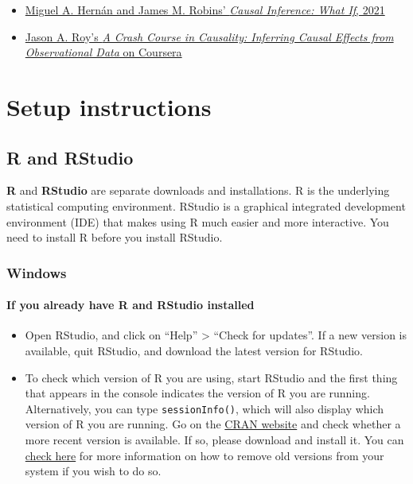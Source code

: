 \documentclass[12pt, krantz2,]{book}
\providecommand{\tightlist}{%
  \setlength{\itemsep}{0pt}\setlength{\parskip}{0pt}}
\let\oldparagraph\paragraph
\renewcommand{\paragraph}[1]{\oldparagraph{#1}\mbox{}}
\theoremstyle{definition}
\theoremstyle{definition}
\theoremstyle{definition}
\newcommand{\1}{\mathbbm{1}}
\begin{document}
\begin{itemize}
\tightlist
\item
  \href{https://www.hsph.harvard.edu/miguel-hernan/causal-inference-book/}{Miguel A. Hernán and James M. Robins' \emph{Causal Inference: What If},
  2021}
\item
  \href{https://www.coursera.org/learn/crash-course-in-causality}{Jason A. Roy's \emph{A Crash Course in Causality: Inferring Causal Effects from
  Observational Data} on
  Coursera}
\end{itemize}

\hypertarget{setup}{%
\section{Setup instructions}\label{setup}}

\hypertarget{r-and-rstudio}{%
\subsection{R and RStudio}\label{r-and-rstudio}}

\textbf{R} and \textbf{RStudio} are separate downloads and installations. R is the
underlying statistical computing environment. RStudio is a graphical integrated
development environment (IDE) that makes using R much easier and more
interactive. You need to install R before you install RStudio.

\hypertarget{windows}{%
\subsubsection{Windows}\label{windows}}

\hypertarget{if-you-already-have-r-and-rstudio-installed}{%
\paragraph{If you already have R and RStudio installed}\label{if-you-already-have-r-and-rstudio-installed}}

\begin{itemize}
\tightlist
\item
  Open RStudio, and click on ``Help'' \textgreater{} ``Check for updates''. If a new version is
  available, quit RStudio, and download the latest version for RStudio.
\item
  To check which version of R you are using, start RStudio and the first thing
  that appears in the console indicates the version of R you are
  running. Alternatively, you can type \texttt{sessionInfo()}, which will also display
  which version of R you are running. Go on the \href{https://cran.r-project.org/bin/windows/base/}{CRAN
  website} and check whether a
  more recent version is available. If so, please download and install it. You
  can \href{https://cran.r-project.org/bin/windows/base/rw-FAQ.html\#How-do-I-UNinstall-R_003f}{check here}
  for more information on how to remove old versions from your system if you
  wish to do so.
\end{itemize}
\end{document}
